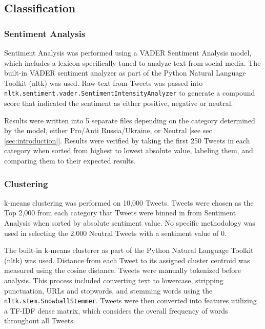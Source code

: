 \documentclass[12pt,letterpaper,oneside,titlepage]{article}
\begin{document}
\subsection{Classification}\label{subsec:classification}

\subsubsection{Sentiment Analysis}\label{subsubsec:sa}

Sentiment Analysis was performed using a VADER Sentiment Analysis model, which includes a lexicon
specifically tuned to analyze text from social media\cite{vader}.
The built-in VADER sentiment analyzer as part of the Python Natural Language Toolkit (nltk) was used.
Raw text from Tweets was passed into \lstinline{nltk.sentiment.vader.SentimentIntensityAnalyzer}\lstinline{} 
to generate a compound score that indicated the sentiment as either positive, negative or neutral. 

Results were written into 5 separate files depending on the category determined by the model, either Pro/Anti 
Russia/Ukraine, or Neutral [see sec \ref{sec:introduction}].
Results were verified by taking the first 250 Tweets in each category when sorted from highest to lowest absolute value, 
labeling them, and comparing them to their expected results.

\subsubsection{Clustering}\label{subsubsec:clustering}

k-means clustering was performed on 10,000 Tweets. 
Tweets were chosen as the Top 2,000 from each category that Tweets were binned in from Sentiment Analysis when 
sorted by absolute sentiment value. No specific methodology was used in selecting the 2,000 Neutral Tweets with a 
sentiment value of 0.

The built-in k-means clusterer as part of the Python Natural Language Toolkit (nltk) was used.
Distance from each Tweet to its assigned cluster centroid was measured using the cosine distance.
Tweets were manually tokenized before analysis. This process included converting text to lowercase, 
stripping punctuation, URLs and stopwords, and stemming words using the 
\lstinline{nltk.stem.SnowballStemmer}\lstinline{}. 
Tweets were then converted into features utilizing a TF-IDF dense matrix, which considers the overall frequency
of words throughout all Tweets\cite{tfidf}.
\end{document}

